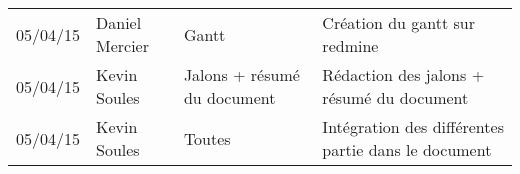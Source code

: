 \small
\begin{tabular}{|p{1.5cm}| >{\raggedright}p{2.9cm}| >{\raggedright}p{3.2cm}|p{7.2cm}|}
  \hline
  \rowcolor{Gainsboro} \color{Navy}{\bfseries Date}  & \color{Navy}{\bfseries Auteur} & \color{Navy}{\bfseries Section(s)}  &\color{Navy}{\bfseries Commentaires} \\
  \hline
  05/04/15 & Daniel Mercier & Gantt  & Création du gantt sur redmine \\
  \hline
  05/04/15 & Kevin Soules & Jalons + résumé du document & Rédaction des jalons + résumé du document\\
  \hline
  05/04/15 & Kevin Soules & Toutes & Intégration des différentes partie dans le document\\
  \hline
\end{tabular}
\normalsize
